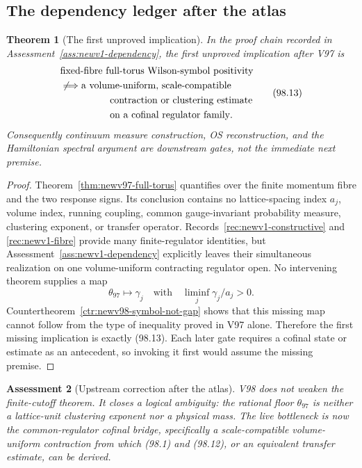 \documentclass[11pt,oneside]{article}
\newtheorem{theorem}{Theorem}[section]
\newtheorem{assessment}[theorem]{Assessment}
\theoremstyle{definition}
\theoremstyle{remark}
\begin{document}
\subsection{The dependency ledger after the atlas}

\begin{theorem}[The first unproved implication]
\label{thm:newv98-first-gap}
In the proof chain recorded in
Assessment~\ref{ass:newv1-dependency}, the first unproved implication
after V97 is
\begin{equation}
\begin{split}
 &\text{fixed-fibre full-torus Wilson-symbol positivity}\\
 &\not\Longrightarrow
 \text{a volume-uniform, scale-compatible}\\
 &\hspace{18mm}\text{contraction or clustering estimate}\\
 &\hspace{18mm}\text{on a cofinal regulator family}.
\end{split}
\tag{98.13}
\end{equation}
Consequently continuum measure construction,
OS reconstruction, and the Hamiltonian spectral
argument are downstream gates, not the immediate next premise.
\end{theorem}

\begin{proof}
Theorem~\ref{thm:newv97-full-torus} quantifies over the finite
momentum fibre and the two response signs.  Its conclusion contains
no lattice-spacing index \(a_j\), volume index, running coupling,
common gauge-invariant probability measure, clustering exponent, or
transfer operator.  Records~\ref{rec:newv1-constructive} and
\ref{rec:newv1-fibre} provide many finite-regulator identities, but
Assessment~\ref{ass:newv1-dependency} explicitly leaves their
simultaneous realization on one volume-uniform contracting
regulator open.  No intervening theorem supplies a map
\[
 \theta_{97}\longmapsto\gamma_j
 \quad\text{with}\quad
 \liminf_j\gamma_j/a_j>0.                            \tag{98.14}
\]
Countertheorem~\ref{ctr:newv98-symbol-not-gap} shows that this
missing map cannot follow from the type of inequality proved in V97
alone.  Therefore the first missing implication is exactly
(98.13).  Each later gate requires a cofinal state or estimate as an
antecedent, so invoking it first would assume the missing premise.
\end{proof}

\begin{assessment}[Upstream correction after the atlas]
\label{ass:newv98}
V98 does not weaken the finite-cutoff theorem.  It closes a logical
ambiguity: the rational floor \(\theta_{97}\) is neither a
lattice-unit clustering exponent nor a physical mass.  The live
bottleneck is now the common-regulator cofinal bridge, specifically
a scale-compatible volume-uniform contraction from which (98.1) and
(98.12), or an equivalent transfer estimate, can be derived.
\end{assessment}
\end{document}
